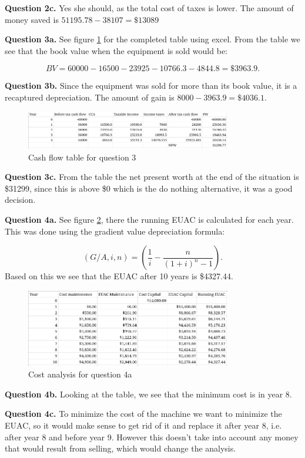 \documentclass[letterpaper, reqno,11pt]{article}
\begin{document}
{\noindent\bf Question 2c.} Yes she should, as the total cost of taxes is lower. The amount of money saved is $51195.78-38107=\$13089$

{\noindent\bf Question 3a.} See figure \ref{fig:q3} for the completed table using excel. From the table we see that the book value when the equipment is sold would be: 

\[
BV=60000-16500-23925-10766.3-4844.8=\$3963.9
.\]

{\noindent\bf Question 3b.} Since the equipment was sold for more than its book value, it is a recaptured depreciation. The amount of gain is $8000-3963.9=\$4036.1$. 

\begin{figure}[htpb]
    \centering
    \includegraphics[width=0.8\textwidth]{q3}
    \caption{Cash flow table for question 3}
    \label{fig:q3}
\end{figure}

{\noindent\bf Question 3c.} From the table the net present worth at the end of the situation is \$31299, since this is above \$0 which is the do nothing alternative, it was a good decision. 

{\noindent\bf Question 4a.} See figure \ref{fig:q4}, there the running EUAC is calculated for each year. This was done using the gradient value depreciation formula: 

\[
    (G/A, i, n)=\left( \frac{1}{i}-\frac{n}{(1+i)^{n}-1} \right) 
.\]
Based on this we see that the EUAC after 10 years is \$4327.44. 

\begin{figure}[htpb]
    \centering
    \includegraphics[width=0.8\textwidth]{q4}
    \caption{Cost analysis for question 4a}
    \label{fig:q4}
\end{figure}

{\noindent\bf Question 4b.} Looking at the table, we see that the minimum cost is in year 8. 

{\noindent\bf Question 4c.} To minimize the cost of the machine we want to minimize the EUAC, so it would make sense to get rid of it and replace it after year 8, i.e. after year 8 and before year 9. However this doesn't take into account any money that would result from selling, which would change the analysis. 
\end{document}
